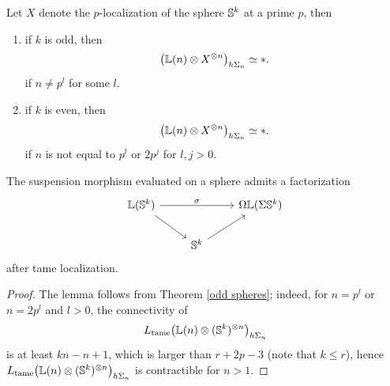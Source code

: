  
 \begin{theorem}
 	\cite[Theorem 3.13, Theorem 4.4]{Arone-Mahowald}
 	\label{odd spheres}
 	Let $X$ denote the $p$-localization of the sphere ${\mathbb{S}}^k$ at a prime $p$, then
 	\begin{enumerate}
 		\item if $k$ is odd, then 
 			$$
 			\big({\mathbb{L}}(n)\otimes X^{\otimes n}
 			\big)_{h\Sigma_n}
 			\simeq *.
 			$$
 			if $n\neq p^l$ for some $l$.
 		\item if $k$ is even, then 
 			$$
 			\big({\mathbb{L}}(n)\otimes X^{\otimes n}
 			\big)_{h\Sigma_n}
 			\simeq *.
 			$$
 			if $n$ is not equal to $p^l$ or $2p^j$ for $l, j>0$.
 	\end{enumerate} 	
 \end{theorem}
 \begin{lemma}
 
 	The suspension morphism evaluated on a sphere admits a factorization
\[
\begin{tikzcd}
	 \BL(\BS^{k}) &   &  \Omega \BL (\Sigma \BS^{k})\\
	& \BS^{k}  &
	\arrow[from=1-1, to = 1-3, "\sigma"]
	\arrow[from=1-1 , to =2-2]
	\arrow[from=2-2, to=1-3]
\end{tikzcd}
\]
after tame localization.
\end{lemma}
\begin{proof}
	The lemma follows from Theorem \ref{odd spheres}; indeed, for $n=p^l$ or $n=2p^l$ and $l>0$, the connectivity of
	\[
	L_{\operatorname{\operatorname{tame}}}\big(
	{\mathbb{L}}(n)\otimes ({\mathbb{S}}^{k})^{\otimes n}
	\big)_{h\Sigma_n}
	\]
	is at least $kn-n+1$, which is larger than $r+2p-3$ (note that $k\leq r$), hence 
	$L_{\operatorname{\operatorname{tame}}}\big(
	{\mathbb{L}}(n)\otimes ({\mathbb{S}}^{k})^{\otimes n}
	\big)_{h\Sigma_n}$ is contractible for $n>1$.
	
	\end{proof}

